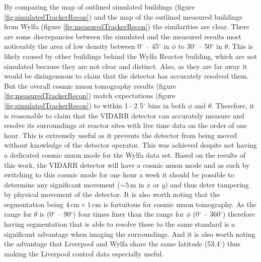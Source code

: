 


By comparing the map of outlined simulated buildings (figure \ref{fig:simulatedTrackerRecon}) and the map of the outlined measured buildings from Wylfa (figure \ref{fig:measuredTrackerRecon}) the similarities are clear. There are some discrepancies between the simulated and the measured results most noticeably the area of low density between 0$^\circ$ -- 45$^\circ$ in $\phi$ to 30$^\circ$ -- 50$^\circ$ in $\theta$. This is likely caused by other buildings behind the Wylfa Reactor building, which are not simulated because they are not clear and distinct. Also, as they are far away it would be disingenuous to claim that the detector has accurately resolved them. But the overall cosmic muon tomography results (figure \ref{fig:measuredTrackerRecon}) match expectations (figure \ref{fig:simulatedTrackerRecon}) to within 1\,--\,2 5$^\circ$ bins in both $\phi$ and $\theta$. Therefore, it is reasonable to claim that the VIDARR detector can accurately measure and resolve its surroundings at reactor sites with live time data on the order of one hour. This is extremely useful as it prevents the detector from being moved without knowledge of the detector operator. This was achieved despite not having a dedicated cosmic muon mode for the Wylfa data set. Based on the results of this work, the VIDARR detector will have a cosmic muon mode and as such by switching to this cosmic mode for one hour a week it should be possible to determine any significant movement ($\sim 5\,\textrm{m}$ in $x$ or $y$) and thus deter tampering by physical movement of the detector. It is also worth noting that the segmentation being $4\,\textrm{cm} \times 1\,\textrm{cm}$ is fortuitous for cosmic muon tomography. As the range for $\theta$ is (0$^\circ$ -- 90$^\circ$) four times finer than the range for $\phi$ (0$^\circ$ -- 360$^\circ$) therefore having segmentation that is able to resolve these to the same standard is a significant advantage when imaging the surroundings. And it is also worth noting the advantage that Liverpool and Wylfa share the same latitude (53.4$^\circ$) thus making the Liverpool control data especially useful. %

